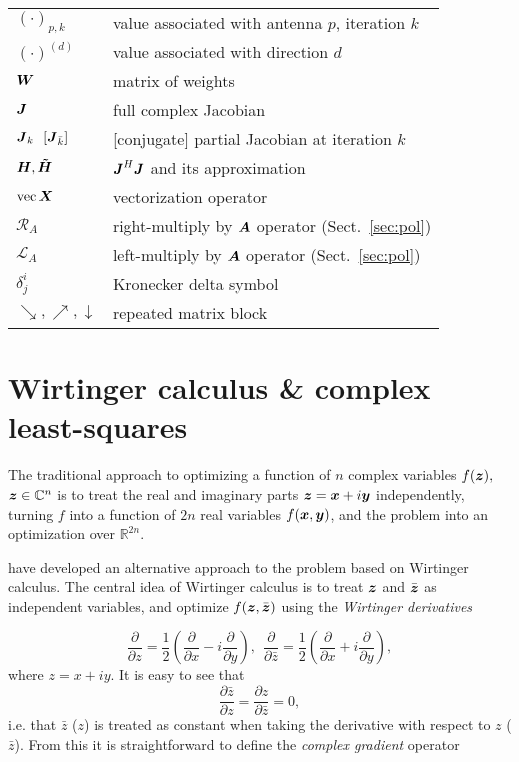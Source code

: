 \documentclass[useAMS,usenatbib]{mn2e}
\newcommand{\COMPLEX}{\mathbb{C}}
\newcommand{\REAL}{\mathbb{R}}
\newcommand{\zz}{\bmath{z}}
\newcommand{\mat}[1]{{\bmath{#1}}}
\newcommand{\JJ}{\mat{J}} %
\newcommand{\JHJ}{\JJ^H\JJ} %
\newcommand{\Rop}[1]{\mathcal{R}_{{#1}}}
\newcommand{\Lop}[1]{\mathcal{L}_{{#1}}}
\begin{document}
\begin{table}
\begin{tabular}{ll}
$(\cdot)_{p,k}$ & value associated with antenna $p$, iteration $k$ \\
$(\cdot)^{(d)}$ & value associated with direction $d$\\
$\bmath{W}$ & matrix of weights \\
$\JJ$ & full complex Jacobian \\
$\JJ_k~~[\JJ_{\bar k}]$ & [conjugate] partial Jacobian at iteration $k$\\
$\bmath{H}, \bmath{\tilde{H}}$ & $\JHJ$ and its approximation \\
$\mathrm{vec}\,\bmath{X}$ & vectorization operator \\
$\Rop{A}$ & right-multiply by $\bmath{A}$ operator (Sect.~\ref{sec:pol}) \\
$\Lop{A}$ & left-multiply by $\bmath{A}$ operator (Sect.~\ref{sec:pol}) \\
$\delta^i_j$ & Kronecker delta symbol \\
$\searrow,\nearrow,\downarrow$ & repeated matrix block \\
\hline



\end{tabular}
\end{table}

\section{Wirtinger calculus \& complex least-squares}
\label{sec:Wirtinger}

The traditional approach to optimizing a function of $n$ complex variables $f(\zz),$ $\zz\in\COMPLEX^n$ is
to treat the real and imaginary parts $\zz=\bmath{x}+i\bmath{y}$ independently, turning $f$ into a function
of $2n$ real variables $f(\bmath{x},\bmath{y})$, and the problem into an optimization over $\REAL^{2n}$.

\citet{ComplexOpt} have developed an alternative approach to the problem based on Wirtinger calculus. The central idea
of Wirtinger calculus is to treat $\zz$ and $\bar{\zz}$ as independent variables, and optimize $f(\zz,\bar{\zz})$
using the {\em Wirtinger derivatives} 

\[
\frac{\partial}{\partial z} = \frac{1}{2}\left ( \frac{\partial}{\partial x} - i\frac{\partial}{\partial y} \right),~~
\frac{\partial}{\partial \bar{z}} = \frac{1}{2}\left ( \frac{\partial}{\partial x} + i\frac{\partial}{\partial y} \right),
\]
where $z=x+iy$. It is easy to see that  
\[
\frac{\partial \bar z}{\partial z} = 
\frac{\partial z}{\partial \bar z} = 0,
\]
i.e. that $\bar z$ ($z$) is treated as constant when taking the derivative with respect to $z$ ($\bar z$). From this 
it is straightforward to define the \emph{complex gradient} operator 
\end{document}
